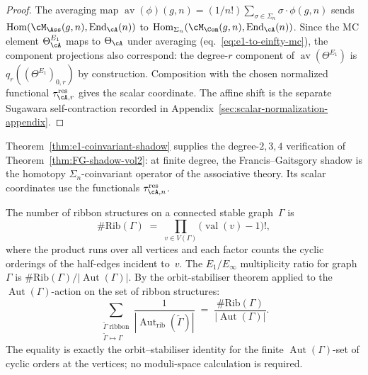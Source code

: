 \begin{proof}
The averaging map
$\operatorname{av}(\phi)(g,n) =
(1/n!)\sum_{\sigma \in \Sigma_n} \sigma \cdot \phi(g,n)$
sends $\operatorname{Hom}(\cM_\Ass(g,n), \operatorname{End}_\cA(n))$
to $\operatorname{Hom}_{\Sigma_n}(\cM_\Com(g,n),
\operatorname{End}_\cA(n))$. Since the MC element
$\Theta^{E_1}_\cA$ maps to $\Theta_\cA$ under averaging
(eq.~\eqref{eq:e1-to-einfty-mc}), the component projections also
correspond: the degree-$r$ component of
$\operatorname{av}(\Theta^{E_1})$ is
$q_r((\Theta^{E_1})_{0,r})$ by construction.  Composition with the
chosen normalized functional $\tau_{\cA,r}^{\mathrm{res}}$ gives the
scalar coordinate.  The affine shift is the separate Sugawara
self-contraction recorded in
Appendix~\ref{sec:scalar-normalization-appendix}.
\end{proof}

\begin{remark}
\label{rem:e1-coinvariant-shadow-fg}
Theorem~\ref{thm:e1-coinvariant-shadow} supplies the degree-$2,3,4$
verification of Theorem~\ref{thm:FG-shadow-vol2}: at finite degree, the
Francis--Gaitsgory shadow is the homotopy $\Sigma_n$-coinvariant
operator of the associative theory.  Its scalar coordinates use the
functionals $\tau_{\cA,n}^{\mathrm{res}}$.
\end{remark}

\begin{remark}
\label{rem:ribbon-structure-count}
\ClaimStatusProvedHere
{}
The number of ribbon structures on a connected stable
graph~$\Gamma$ is
\begin{equation}
\label{eq:ribbon-structure-count}
\#\mathrm{Rib}(\Gamma)
\;=\;
\prod_{v \in V(\Gamma)} \bigl(\operatorname{val}(v) - 1\bigr)!,
\end{equation}
where the product runs over all vertices and each factor
counts the cyclic orderings of the half-edges incident
to~$v$. The $E_1/E_\infty$ multiplicity ratio for graph~$\Gamma$
is $\#\mathrm{Rib}(\Gamma)/|\operatorname{Aut}(\Gamma)|$. By the
orbit-stabiliser theorem applied to the $\operatorname{Aut}(\Gamma)$-action
on the set of ribbon structures:
\[
\sum_{\substack{\widetilde\Gamma\;\text{ribbon} \\
 \widetilde\Gamma \mapsto \Gamma}}
\frac{1}{|\operatorname{Aut}_{\mathrm{rib}}(\widetilde\Gamma)|}
\;=\;
\frac{\#\mathrm{Rib}(\Gamma)}{|\operatorname{Aut}(\Gamma)|}.
\]
The equality is exactly the orbit--stabiliser identity for the
finite $\operatorname{Aut}(\Gamma)$-set of cyclic orders at the
vertices; no moduli-space calculation is required.
\end{remark}

